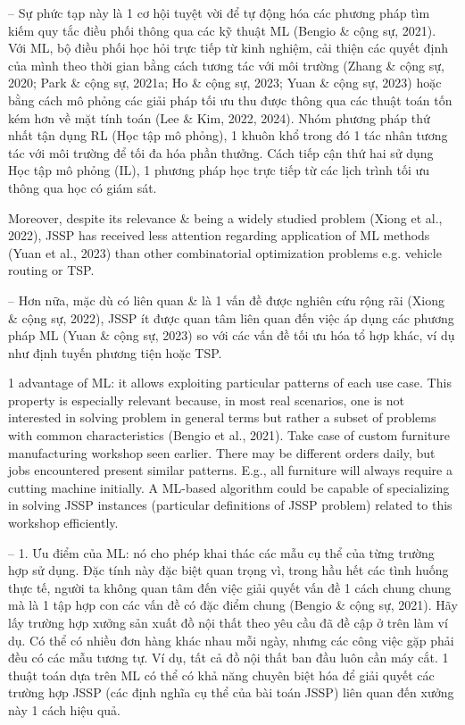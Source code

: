 \documentclass{article}
\begin{document}
\begin{itemize}
    -- Sự phức tạp này là 1 cơ hội tuyệt vời để tự động hóa các phương pháp tìm kiếm quy tắc điều phối thông qua các kỹ thuật ML (Bengio \& cộng sự, 2021). Với ML, bộ điều phối học hỏi trực tiếp từ kinh nghiệm, cải thiện các quyết định của mình theo thời gian bằng cách tương tác với môi trường (Zhang \& cộng sự, 2020; Park \& cộng sự, 2021a; Ho \& cộng sự, 2023; Yuan \& cộng sự, 2023) hoặc bằng cách mô phỏng các giải pháp tối ưu thu được thông qua các thuật toán tốn kém hơn về mặt tính toán (Lee \& Kim, 2022, 2024). Nhóm phương pháp thứ nhất tận dụng RL (Học tập mô phỏng), 1 khuôn khổ trong đó 1 tác nhân tương tác với môi trường để tối đa hóa phần thưởng. Cách tiếp cận thứ hai sử dụng Học tập mô phỏng (IL), 1 phương pháp học trực tiếp từ các lịch trình tối ưu thông qua học có giám sát.

    Moreover, despite its relevance \& being a widely studied problem (Xiong et al., 2022), JSSP has received less attention regarding application of ML methods (Yuan et al., 2023) than other combinatorial optimization problems e.g. vehicle routing or TSP.

    -- Hơn nữa, mặc dù có liên quan \& là 1 vấn đề được nghiên cứu rộng rãi (Xiong \& cộng sự, 2022), JSSP ít được quan tâm liên quan đến việc áp dụng các phương pháp ML (Yuan \& cộng sự, 2023) so với các vấn đề tối ưu hóa tổ hợp khác, ví dụ như định tuyến phương tiện hoặc TSP.

    1 advantage of ML: it allows exploiting particular patterns of each use case. This property is especially relevant because, in most real scenarios, one is not interested in solving problem in general terms but rather a subset of problems with common characteristics (Bengio et al., 2021). Take case of custom furniture manufacturing workshop seen earlier. There may be different orders daily, but jobs encountered present similar patterns. E.g., all furniture will always require a cutting machine initially. A ML-based algorithm could be capable of specializing in solving JSSP instances (particular definitions of JSSP problem) related to this workshop efficiently.

    -- 1. Ưu điểm của ML: nó cho phép khai thác các mẫu cụ thể của từng trường hợp sử dụng. Đặc tính này đặc biệt quan trọng vì, trong hầu hết các tình huống thực tế, người ta không quan tâm đến việc giải quyết vấn đề 1 cách chung chung mà là 1 tập hợp con các vấn đề có đặc điểm chung (Bengio \& cộng sự, 2021). Hãy lấy trường hợp xưởng sản xuất đồ nội thất theo yêu cầu đã đề cập ở trên làm ví dụ. Có thể có nhiều đơn hàng khác nhau mỗi ngày, nhưng các công việc gặp phải đều có các mẫu tương tự. Ví dụ, tất cả đồ nội thất ban đầu luôn cần máy cắt. 1 thuật toán dựa trên ML có thể có khả năng chuyên biệt hóa để giải quyết các trường hợp JSSP (các định nghĩa cụ thể của bài toán JSSP) liên quan đến xưởng này 1 cách hiệu quả.


\end{itemize}
\end{document}
